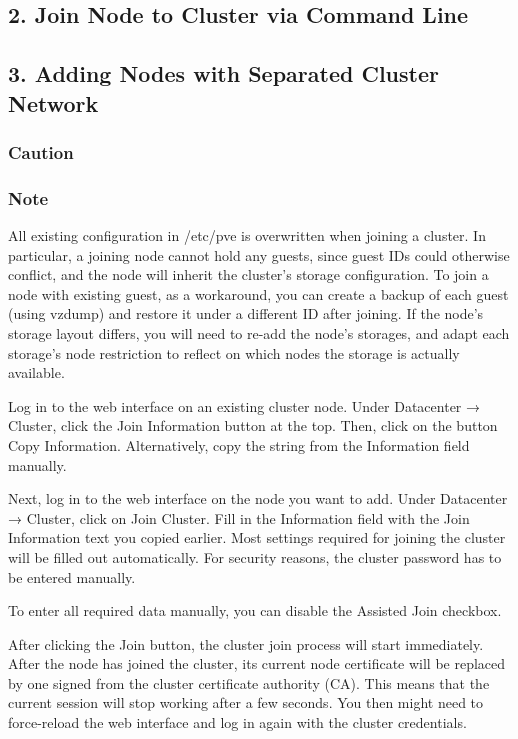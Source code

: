 \subsection{2. Join Node to Cluster via Command Line}

\subsection{3. Adding Nodes with Separated Cluster Network}

\subsubsection{Caution}

\subsubsection{Note}

All existing configuration in /etc/pve is overwritten when joining a cluster. In particular, a joining node cannot hold any guests, since guest IDs could otherwise conflict, and the node will inherit the cluster’s storage configuration. To join a node with existing guest, as a workaround, you can create a backup of each guest (using vzdump) and restore it under a different ID after joining. If the node’s storage layout differs, you will need to re-add the node’s storages, and adapt each storage’s node restriction to reflect on which nodes the storage is actually available.

Log in to the web interface on an existing cluster node. Under Datacenter → Cluster, click the Join Information button at the top. Then, click on the button Copy Information. Alternatively, copy the string from the Information field manually.

Next, log in to the web interface on the node you want to add. Under Datacenter → Cluster, click on Join Cluster. Fill in the Information field with the Join Information text you copied earlier. Most settings required for joining the cluster will be filled out automatically. For security reasons, the cluster password has to be entered manually.

To enter all required data manually, you can disable the Assisted Join checkbox.

After clicking the Join button, the cluster join process will start immediately. After the node has joined the cluster, its current node certificate will be replaced by one signed from the cluster certificate authority (CA). This means that the current session will stop working after a few seconds. You then might need to force-reload the web interface and log in again with the cluster credentials.

